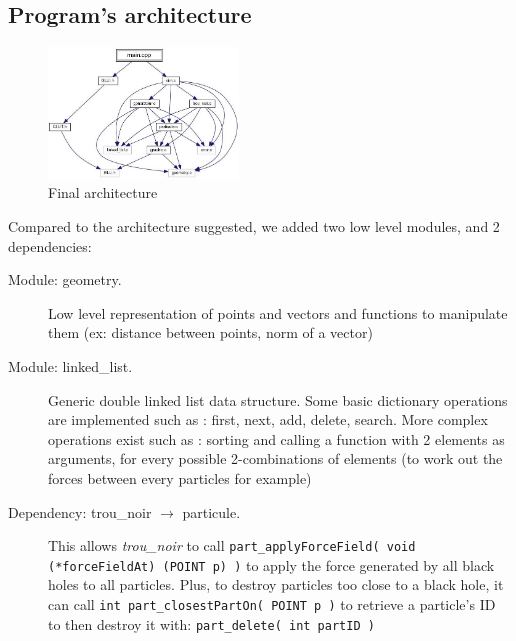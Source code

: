 \documentclass[a4paper]{article} %
\begin{document}
\begin{multicols*}{2}
\section{Program's architecture}


\begin{figure}[H]
\centering
\includegraphics[width=0.45\textwidth]{architecture.jpg}
\caption{Final architecture}
\end{figure}


Compared to the architecture suggested, we added two low level modules, and 2 dependencies:
\begin{description}
\item[Module: geometry.]
Low level representation of points and vectors and functions to manipulate them (ex: distance between points, norm of a vector)


\item[Module: linked\_list.]
Generic double linked list data structure.
Some basic dictionary operations are implemented such as : first, next, add, delete, search.
More complex operations exist such as : sorting and calling a function with 2 elements as arguments, for every possible 2-combinations of elements
(to work out the forces between every particles for example)


\item[Dependency: trou\_noir $\rightarrow$ particule.]
This allows \emph{trou\_noir} to call \texttt{part\_applyForceField( void (*forceFieldAt) (POINT p) )}
to apply the force generated by all black holes to all particles.
Plus, to destroy particles too close to a black hole, it can call \texttt{int part\_closestPartOn( POINT p )}
to retrieve a particle's ID to then destroy it with: \texttt{part\_delete( int partID )}


\end{description}
\end{multicols*}
\end{document}

